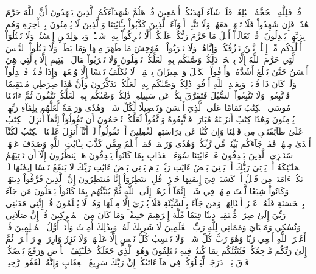 قُلۡ فَلِلَّهِ ٱلۡحُجَّةُ ٱلۡبَٰلِغَةُۖ فَلَوۡ شَآءَ لَهَدَىٰكُمۡ أَجۡمَعِينَ
قُلۡ هَلُمَّ شُهَدَآءَكُمُ ٱلَّذِينَ يَشۡهَدُونَ أَنَّ ٱللَّهَ حَرَّمَ هَٰذَاۖ فَإِن شَهِدُواْ فَلَا تَشۡهَدۡ مَعَهُمۡۚ وَلَا تَتَّبِعۡ أَهۡوَآءَ ٱلَّذِينَ كَذَّبُواْ بِـَٔايَٰتِنَا وَٱلَّذِينَ لَا يُؤۡمِنُونَ بِٱلۡأٓخِرَةِ وَهُم بِرَبِّهِمۡ يَعۡدِلُونَ
۞قُلۡ تَعَالَوۡاْ أَتۡلُ مَا حَرَّمَ رَبُّكُمۡ عَلَيۡكُمۡۖ أَلَّا تُشۡرِكُواْ بِهِۦ شَيۡـٔٗاۖ وَبِٱلۡوَٰلِدَيۡنِ إِحۡسَٰنٗاۖ وَلَا تَقۡتُلُوٓاْ أَوۡلَٰدَكُم مِّنۡ إِمۡلَٰقٖ نَّحۡنُ نَرۡزُقُكُمۡ وَإِيَّاهُمۡۖ وَلَا تَقۡرَبُواْ ٱلۡفَوَٰحِشَ مَا ظَهَرَ مِنۡهَا وَمَا بَطَنَۖ وَلَا تَقۡتُلُواْ ٱلنَّفۡسَ ٱلَّتِي حَرَّمَ ٱللَّهُ إِلَّا بِٱلۡحَقِّۚ ذَٰلِكُمۡ وَصَّىٰكُم بِهِۦ لَعَلَّكُمۡ تَعۡقِلُونَ
وَلَا تَقۡرَبُواْ مَالَ ٱلۡيَتِيمِ إِلَّا بِٱلَّتِي هِيَ أَحۡسَنُ حَتَّىٰ يَبۡلُغَ أَشُدَّهُۥۚ وَأَوۡفُواْ ٱلۡكَيۡلَ وَٱلۡمِيزَانَ بِٱلۡقِسۡطِۖ لَا نُكَلِّفُ نَفۡسًا إِلَّا وُسۡعَهَاۖ وَإِذَا قُلۡتُمۡ فَٱعۡدِلُواْ وَلَوۡ كَانَ ذَا قُرۡبَىٰۖ وَبِعَهۡدِ ٱللَّهِ أَوۡفُواْۚ ذَٰلِكُمۡ وَصَّىٰكُم بِهِۦ لَعَلَّكُمۡ تَذَكَّرُونَ
وَأَنَّ هَٰذَا صِرَٰطِي مُسۡتَقِيمٗا فَٱتَّبِعُوهُۖ وَلَا تَتَّبِعُواْ ٱلسُّبُلَ فَتَفَرَّقَ بِكُمۡ عَن سَبِيلِهِۦۚ ذَٰلِكُمۡ وَصَّىٰكُم بِهِۦ لَعَلَّكُمۡ تَتَّقُونَ
ثُمَّ ءَاتَيۡنَا مُوسَى ٱلۡكِتَٰبَ تَمَامًا عَلَى ٱلَّذِيٓ أَحۡسَنَ وَتَفۡصِيلٗا لِّكُلِّ شَيۡءٖ وَهُدٗى وَرَحۡمَةٗ لَّعَلَّهُم بِلِقَآءِ رَبِّهِمۡ يُؤۡمِنُونَ
وَهَٰذَا كِتَٰبٌ أَنزَلۡنَٰهُ مُبَارَكٞ فَٱتَّبِعُوهُ وَٱتَّقُواْ لَعَلَّكُمۡ تُرۡحَمُونَ
أَن تَقُولُوٓاْ إِنَّمَآ أُنزِلَ ٱلۡكِتَٰبُ عَلَىٰ طَآئِفَتَيۡنِ مِن قَبۡلِنَا وَإِن كُنَّا عَن دِرَاسَتِهِمۡ لَغَٰفِلِينَ
أَوۡ تَقُولُواْ لَوۡ أَنَّآ أُنزِلَ عَلَيۡنَا ٱلۡكِتَٰبُ لَكُنَّآ أَهۡدَىٰ مِنۡهُمۡۚ فَقَدۡ جَآءَكُم بَيِّنَةٞ مِّن رَّبِّكُمۡ وَهُدٗى وَرَحۡمَةٞۚ فَمَنۡ أَظۡلَمُ مِمَّن كَذَّبَ بِـَٔايَٰتِ ٱللَّهِ وَصَدَفَ عَنۡهَاۗ سَنَجۡزِي ٱلَّذِينَ يَصۡدِفُونَ عَنۡ ءَايَٰتِنَا سُوٓءَ ٱلۡعَذَابِ بِمَا كَانُواْ يَصۡدِفُونَ
هَلۡ يَنظُرُونَ إِلَّآ أَن تَأۡتِيَهُمُ ٱلۡمَلَـٰٓئِكَةُ أَوۡ يَأۡتِيَ رَبُّكَ أَوۡ يَأۡتِيَ بَعۡضُ ءَايَٰتِ رَبِّكَۗ يَوۡمَ يَأۡتِي بَعۡضُ ءَايَٰتِ رَبِّكَ لَا يَنفَعُ نَفۡسًا إِيمَٰنُهَا لَمۡ تَكُنۡ ءَامَنَتۡ مِن قَبۡلُ أَوۡ كَسَبَتۡ فِيٓ إِيمَٰنِهَا خَيۡرٗاۗ قُلِ ٱنتَظِرُوٓاْ إِنَّا مُنتَظِرُونَ
إِنَّ ٱلَّذِينَ فَرَّقُواْ دِينَهُمۡ وَكَانُواْ شِيَعٗا لَّسۡتَ مِنۡهُمۡ فِي شَيۡءٍۚ إِنَّمَآ أَمۡرُهُمۡ إِلَى ٱللَّهِ ثُمَّ يُنَبِّئُهُم بِمَا كَانُواْ يَفۡعَلُونَ
مَن جَآءَ بِٱلۡحَسَنَةِ فَلَهُۥ عَشۡرُ أَمۡثَالِهَاۖ وَمَن جَآءَ بِٱلسَّيِّئَةِ فَلَا يُجۡزَىٰٓ إِلَّا مِثۡلَهَا وَهُمۡ لَا يُظۡلَمُونَ
قُلۡ إِنَّنِي هَدَىٰنِي رَبِّيٓ إِلَىٰ صِرَٰطٖ مُّسۡتَقِيمٖ دِينٗا قِيَمٗا مِّلَّةَ إِبۡرَٰهِيمَ حَنِيفٗاۚ وَمَا كَانَ مِنَ ٱلۡمُشۡرِكِينَ
قُلۡ إِنَّ صَلَاتِي وَنُسُكِي وَمَحۡيَايَ وَمَمَاتِي لِلَّهِ رَبِّ ٱلۡعَٰلَمِينَ
لَا شَرِيكَ لَهُۥۖ وَبِذَٰلِكَ أُمِرۡتُ وَأَنَا۠ أَوَّلُ ٱلۡمُسۡلِمِينَ
قُلۡ أَغَيۡرَ ٱللَّهِ أَبۡغِي رَبّٗا وَهُوَ رَبُّ كُلِّ شَيۡءٖۚ وَلَا تَكۡسِبُ كُلُّ نَفۡسٍ إِلَّا عَلَيۡهَاۚ وَلَا تَزِرُ وَازِرَةٞ وِزۡرَ أُخۡرَىٰۚ ثُمَّ إِلَىٰ رَبِّكُم مَّرۡجِعُكُمۡ فَيُنَبِّئُكُم بِمَا كُنتُمۡ فِيهِ تَخۡتَلِفُونَ
وَهُوَ ٱلَّذِي جَعَلَكُمۡ خَلَـٰٓئِفَ ٱلۡأَرۡضِ وَرَفَعَ بَعۡضَكُمۡ فَوۡقَ بَعۡضٖ دَرَجَٰتٖ لِّيَبۡلُوَكُمۡ فِي مَآ ءَاتَىٰكُمۡۗ إِنَّ رَبَّكَ سَرِيعُ ٱلۡعِقَابِ وَإِنَّهُۥ لَغَفُورٞ رَّحِيمُۢ